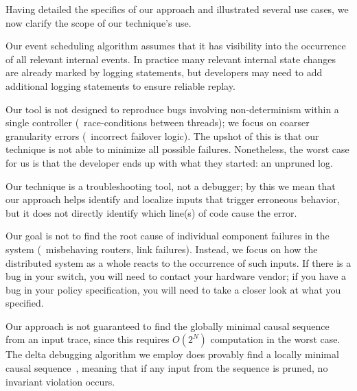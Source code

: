 \label{subsec:non_goals}

Having detailed the specifics of our approach and illustrated several use cases, we now
clarify the scope of our technique's use.

 Our event scheduling algorithm assumes that
it has visibility into the occurrence of all relevant internal events. In
practice many relevant internal state changes are already marked by logging
statements, but developers may need to add additional
logging statements to ensure reliable replay.

 Our tool is not designed to reproduce bugs
involving non-determinism within a single controller (\eg~race-conditions between threads);
we focus on coarser granularity errors (\eg~incorrect failover logic). The upshot of
this is that our technique is not able to minimize all possible failures.
Nonetheless, the worst case for us is that the developer ends up with what they started:
an unpruned log.


 Our technique is a troubleshooting tool, not a debugger;
by this we mean that our approach helps identify and localize inputs that
trigger erroneous behavior, but it does not directly identify which
line(s) of code cause the error.

 Our goal is not to find the root
cause of individual component failures in the system (\eg~misbehaving routers,
link failures). Instead, we focus on
how the distributed system as a whole reacts to the occurrence of such inputs.
If there is a bug in your switch, you will need to contact your hardware vendor;
if you have a bug in your policy specification, you will need to take a closer look at what you specified.

Our approach is not guaranteed to find the globally minimal
causal sequence from an input trace, since this requires $O(2^N)$ computation in the worst case.
The delta debugging algorithm we employ does provably find a
locally minimal causal sequence~\cite{Zeller:1999:YMP:318773.318946},
meaning that if any input from the sequence is pruned, no invariant violation
occurs. 

